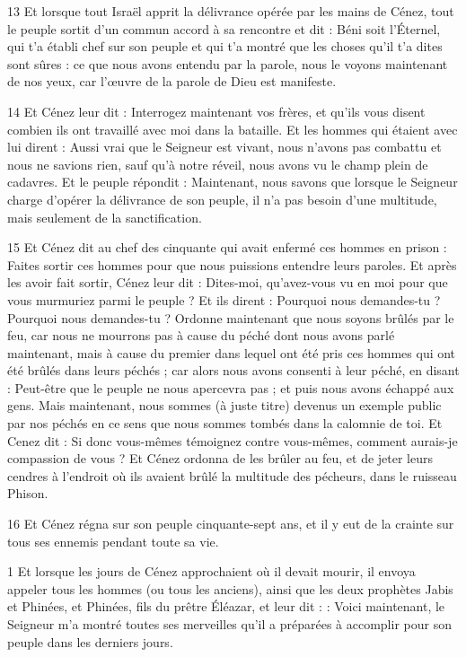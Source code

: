 \par 13 Et lorsque tout Israël apprit la délivrance opérée par les mains de Cénez, tout le peuple sortit d'un commun accord à sa rencontre et dit : Béni soit l'Éternel, qui t'a établi chef sur son peuple et qui t'a montré que les choses qu'il t'a dites sont sûres : ce que nous avons entendu par la parole, nous le voyons maintenant de nos yeux, car l'œuvre de la parole de Dieu est manifeste.

\par 14 Et Cénez leur dit : Interrogez maintenant vos frères, et qu'ils vous disent combien ils ont travaillé avec moi dans la bataille. Et les hommes qui étaient avec lui dirent : Aussi vrai que le Seigneur est vivant, nous n'avons pas combattu et nous ne savions rien, sauf qu'à notre réveil, nous avons vu le champ plein de cadavres. Et le peuple répondit : Maintenant, nous savons que lorsque le Seigneur charge d'opérer la délivrance de son peuple, il n'a pas besoin d'une multitude, mais seulement de la sanctification.

\par 15 Et Cénez dit au chef des cinquante qui avait enfermé ces hommes en prison : Faites sortir ces hommes pour que nous puissions entendre leurs paroles. Et après les avoir fait sortir, Cénez leur dit : Dites-moi, qu'avez-vous vu en moi pour que vous murmuriez parmi le peuple ? Et ils dirent : Pourquoi nous demandes-tu ? Pourquoi nous demandes-tu ? Ordonne maintenant que nous soyons brûlés par le feu, car nous ne mourrons pas à cause du péché dont nous avons parlé maintenant, mais à cause du premier dans lequel ont été pris ces hommes qui ont été brûlés dans leurs péchés ; car alors nous avons consenti à leur péché, en disant : Peut-être que le peuple ne nous apercevra pas ; et puis nous avons échappé aux gens. Mais maintenant, nous sommes (à juste titre) devenus un exemple public par nos péchés en ce sens que nous sommes tombés dans la calomnie de toi. Et Cenez dit : Si donc vous-mêmes témoignez contre vous-mêmes, comment aurais-je compassion de vous ? Et Cénez ordonna de les brûler au feu, et de jeter leurs cendres à l'endroit où ils avaient brûlé la multitude des pécheurs, dans le ruisseau Phison.

\par 16 Et Cénez régna sur son peuple cinquante-sept ans, et il y eut de la crainte sur tous ses ennemis pendant toute sa vie.


\par 1 Et lorsque les jours de Cénez approchaient où il devait mourir, il envoya appeler tous les hommes (ou tous les anciens), ainsi que les deux prophètes Jabis et Phinées, et Phinées, fils du prêtre Éléazar, et leur dit : : Voici maintenant, le Seigneur m'a montré toutes ses merveilles qu'il a préparées à accomplir pour son peuple dans les derniers jours.

